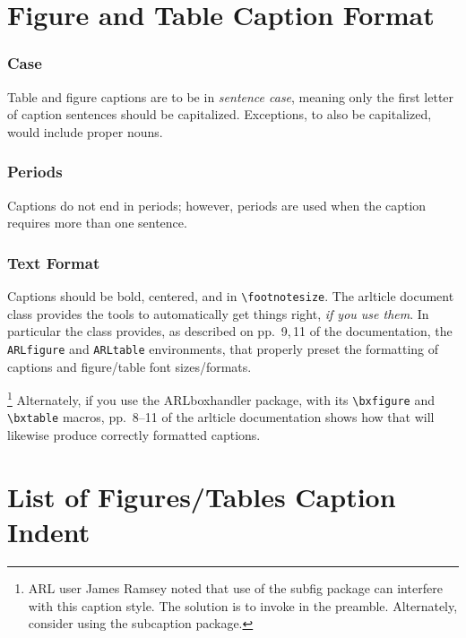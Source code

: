 \documentclass{arlticle}
\def\arlticle{\textsf{\small arlticle}}
\def\boxhandler{\textsf{\small ARLboxhandler}}
\def\subfig{\textsf{\footnotesize subfig}}
\def\subcaption{\textsf{\footnotesize subcaption}}
\begin{document}
\section{Figure and Table Caption Format}

\subsubsection*{Case}

Table and figure captions are to be in \textit{sentence case}, meaning only the
  first letter of caption sentences should be capitalized.  
Exceptions, to also be capitalized, would include proper nouns.

\subsubsection*{Periods}

Captions do not end in periods; however, periods are used 
  when the caption requires more than one sentence.

\subsubsection*{Text Format}

Captions should be bold, centered, and in \verb|\footnotesize|.
The \arlticle{} document class provides the tools to automatically
  get things right, \textit{if you use them}.
In particular the class provides, as described on pp.~9,\,11 of the documentation,
  the \verb|ARLfigure| and \verb|ARLtable| environments, that properly preset
  the formatting of captions and figure/table font sizes/formats.%
\begin{verbbox}[\footnotesize]
\end{verbbox}
\footnote{ARL user James Ramsey noted that use of the \subfig{} package can 
  interfere with this caption style.  The solution is to invoke \theverbbox{} 
  in the preamble.  Alternately, consider using the \subcaption{} package.}
Alternately, if you use the \boxhandler{} package, with its \verb|\bxfigure|
  and \verb|\bxtable| macros, pp.~8--11 of the \arlticle{} documentation shows
  how that will likewise produce correctly formatted captions.

\section{List of Figures/Tables Caption Indent}
\end{document}
